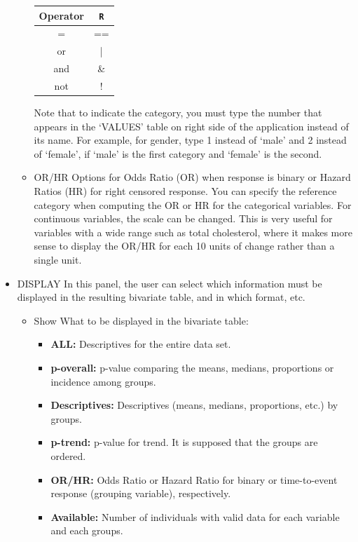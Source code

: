 \documentclass[11pt]{article}
\begin{document}
\begin{itemize}
\begin{itemize}
   		\begin{center}
		\begin{tabular}{cc}
		\hline
		Operator & {\tt R} \\
		\hline
		= & == \\
		or & | \\
		and & \& \\
		not & ! \\
		\hline
		\end{tabular}
		\end{center}
Note that to indicate the category, you must type the number that appears in the `VALUES' table on right side of the application instead of its name. For example, for gender, type 1 instead of `male' and 2 instead of `female', if `male' is the first category and `female' is the second.
	\item \color{blue} OR/HR \color{black} Options for Odds Ratio (OR) when response is binary or Hazard Ratios (HR) for right censored response. You can specify the reference category when computing the OR or HR for the categorical variables. For continuous variables, the scale can be changed. This is very useful for variables with a wide range such as total cholesterol, where it makes more sense to display the OR/HR for each 10 units of change rather than a single unit.
	\end{itemize}
\item \color{blue} DISPLAY \color{black} 
  In this panel, the user can select which information must be displayed in the resulting bivariate table, and in which format, etc.
	\begin{itemize}
	\item \color{blue} Show \color{black} What to be displayed in the bivariate table:
		\begin{itemize}
		\item {\bf ALL:} Descriptives for the entire data set.
		\item {\bf p-overall:} p-value comparing the means, medians, proportions or incidence among groups.
		\item {\bf Descriptives:} Descriptives (means, medians, proportions, etc.) by groups.
		\item {\bf p-trend:} p-value for trend. It is supposed that the groups are ordered.
		\item {\bf OR/HR:} Odds Ratio or Hazard Ratio for binary or time-to-event response (grouping variable), respectively.
		\item {\bf Available:} Number of individuals with valid data for each variable and each groups.

\end{itemize}
\end{itemize}
\end{itemize}
\end{document}
